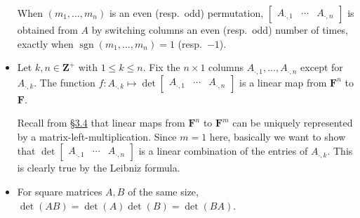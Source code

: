 \documentclass[11pt]{article}
\newcommand{\lk}[2]{\hyperlink{subsection.#1.#2}{\S#1.#2}}
\newcommand{\Z}{\mathbf{Z}}
\newcommand{\F}{\mathbf{F}}
\newcommand{\sgn}{\operatorname{sgn}}
\begin{document}
\begin{itemize}
    When $(m_1,\dots,m_n)$ is an even (resp.\ odd) permutation, $\begin{bmatrix}
        A_{\cdot,1} & \cdots & A_{\cdot,n}
    \end{bmatrix}$ is obtained from $A$ by switching columns an even (resp.\ odd) number of times, exactly when $\sgn(m_1,\dots,m_n) = 1$ (resp.\ $-1$).
    \item Let $k,n \in \Z^+$ with $1 \leq k \leq n$. Fix the $n \times 1$ columns $A_{\cdot,1},\dots,A_{\cdot,n}$ except for $A_{\cdot,k}$. The function $f: A_{\cdot,k} \mapsto \det \begin{bmatrix}
        A_{\cdot,1} & \cdots & A_{\cdot,n}
    \end{bmatrix}$ is a linear map from $\F^n$ to $\F$.
    
    Recall from \lk{3}{4} that linear maps from $\F^n$ to $\F^m$ can be uniquely represented by a matrix-left-multiplication. Since $m=1$ here, basically we want to show that $\det \begin{bmatrix}
        A_{\cdot,1} & \cdots & A_{\cdot,n}
    \end{bmatrix}$ is a linear combination of the entries of $A_{\cdot,k}$. This is clearly true by the Leibniz formula.
    \item For square matrices $A,B$ of the same size, $\det(AB) = \det(A)\det(B) = \det (BA)$.


\end{itemize}
\end{document}
